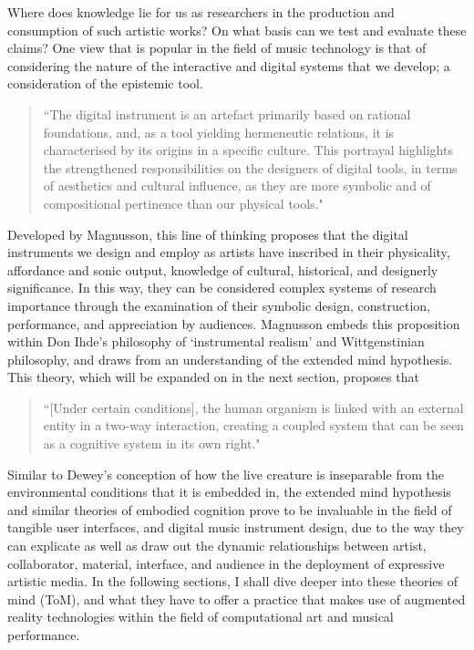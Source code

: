 Where does knowledge lie for us as researchers in the production and consumption of such artistic works? On what basis can we test and evaluate these claims? One view that is popular in the field of music technology is that of considering the nature of the interactive and digital systems that we develop; a consideration of the epistemic tool. 
\begin{quote}
    ``The digital instrument is an artefact primarily based on rational foundations, and, as a tool yielding hermeneutic relations, it is characterised by its origins in a specific culture. This portrayal highlights the strengthened responsibilities on the designers of digital tools, in terms of aesthetics and cultural influence, as they are more symbolic and of compositional pertinence than our physical tools." \citep[p. 335]{magnusson2009a} 
\end{quote}
Developed by Magnusson, this line of thinking proposes that the digital instruments we design and employ as artists have inscribed in their physicality, affordance and sonic output, knowledge of cultural, historical, and designerly significance. In this way, they can be considered complex systems of research importance through the examination of their symbolic design, construction, performance, and appreciation by audiences. Magnusson embeds this proposition within Don Ihde's philosophy of `instrumental realism' and Wittgenstinian philosophy, and draws from an understanding of the extended mind hypothesis. This theory, which will be expanded on in the next section, proposes that 
\begin{quote}
    ``[Under certain conditions], the human organism is linked with an external entity in a two-way interaction, creating a coupled system that can be seen as a cognitive system in its own right." \citep[p. 7]{clark1998}
\end{quote}
Similar to Dewey's conception of how the live creature is inseparable from the environmental conditions that it is embedded in, the extended mind hypothesis and similar theories of embodied cognition prove to be invaluable in the field of tangible user interfaces, and digital music instrument design, due to the way they can explicate as well as draw out the dynamic relationships between artist, collaborator, material, interface, and audience in the deployment of expressive artistic media. In the following sections, I shall dive deeper into these theories of mind (ToM), and what they have to offer a practice that makes use of augmented reality technologies within the field of computational art and musical performance.




